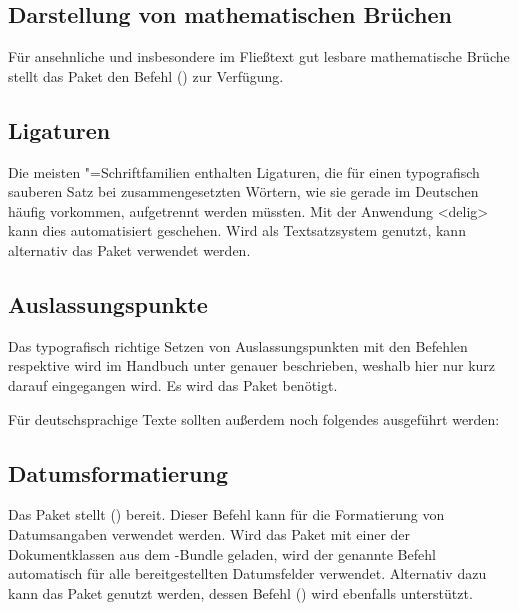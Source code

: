 \documentclass[%
  english,ngerman,%
  cdgeometry=no,DIV=12,%
  automark,%
  listof=toc,%
]{tudscrartcl}
\begin{document}
\subsection{Darstellung von mathematischen Brüchen}
Für ansehnliche und insbesondere im Fließtext gut lesbare mathematische Brüche 
stellt das Paket  den Befehl () zur 
Verfügung.
%
\begin{Preamble}
\usepackage{xfrac}

\end{Preamble}


\subsection{Ligaturen}
Die meisten "=Schriftfamilien enthalten Ligaturen, die für einen 
typografisch sauberen Satz bei zusammengesetzten Wörtern, wie sie gerade im 
Deutschen häufig vorkommen, aufgetrennt werden müssten. Mit der Anwendung 
<delig> kann dies automatisiert geschehen. Wird 
 als Textsatzsystem genutzt, kann alternativ das Paket 
 verwendet werden.


\subsection{Auslassungspunkte}
Das typografisch richtige Setzen von Auslassungspunkten mit den Befehlen 
 respektive  wird im Handbuch unter 
 genauer 
beschrieben, weshalb hier nur kurz darauf eingegangen wird. Es wird das Paket 
 benötigt.
%
\begin{Preamble}
\usepackage{ellipsis}
\end{Preamble}
%
Für deutschsprachige Texte sollten außerdem noch folgendes ausgeführt werden:
%
\begin{Preamble}
\let\ellipsispunctuation\relax

\end{Preamble}



\subsection{Datumsformatierung}
Das Paket  stellt () bereit. 
Dieser Befehl kann für die Formatierung von Datumsangaben verwendet werden. 
Wird das Paket mit einer der Dokumentklassen aus dem \TUDScript-Bundle geladen, 
wird der genannte Befehl automatisch für alle bereitgestellten Datumsfelder 
verwendet. Alternativ dazu kann das Paket  genutzt werden, 
dessen Befehl () wird ebenfalls unterstützt.
%
\begin{Preamble}
\usepackage{isodate}

\end{Preamble}
\end{document}
